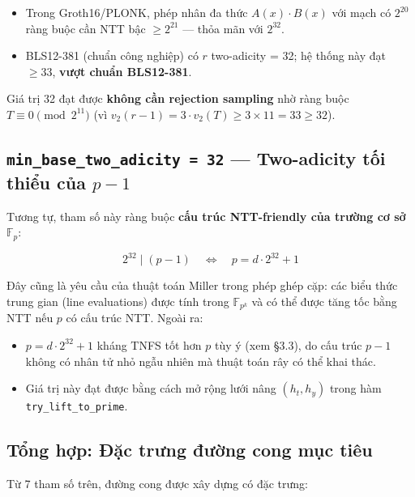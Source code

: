 \begin{itemize}
\tightlist
\item
  Trong Groth16/PLONK, phép nhân đa thức \(A(x) \cdot B(x)\) với mạch có
  \(2^{20}\) ràng buộc cần NTT bậc \(\geq 2^{21}\) --- thỏa mãn với
  \(2^{32}\).
\item
  BLS12-381 (chuẩn công nghiệp) có \(r\) two-adicity = 32; hệ thống này
  đạt \(\geq 33\), \textbf{vượt chuẩn BLS12-381}.
\end{itemize}

Giá trị 32 đạt được \textbf{không cần rejection sampling} nhờ ràng buộc
\(T \equiv 0 \pmod{2^{11}}\) (vì
\(v_2(r-1) = 3 \cdot v_2(T) \geq 3 \times 11 = 33 \geq 32\)).

\subsection{\texorpdfstring{\texttt{min\_base\_two\_adicity\ =\ 32} ---
Two-adicity tối thiểu của
\(p - 1\)}{min\_base\_two\_adicity = 32 --- Two-adicity tối thiểu của p - 1}}\label{min_base_two_adicity-32-two-adicity-tux1ed1i-thiux1ec3u-cux1ee7a-p---1}

Tương tự, tham số này ràng buộc \textbf{cấu trúc NTT-friendly của trường
cơ sở \(\mathbb{F}_p\)}:

\[2^{32} \mid (p - 1) \quad \Longleftrightarrow \quad p = d \cdot 2^{32} + 1\]

Đây cũng là yêu cầu của thuật toán Miller trong phép ghép cặp: các biểu
thức trung gian (line evaluations) được tính trong \(\mathbb{F}_{p^k}\)
và có thể được tăng tốc bằng NTT nếu \(p\) có cấu trúc NTT. Ngoài ra:

\begin{itemize}
\tightlist
\item
  \(p = d \cdot 2^{32} + 1\) kháng TNFS tốt hơn \(p\) tùy ý (xem §3.3),
  do cấu trúc \(p-1\) không có nhân tử nhỏ ngẫu nhiên mà thuật toán rây
  có thể khai thác.
\item
  Giá trị này đạt được bằng cách mở rộng lưới nâng \((h_t, h_y)\) trong
  hàm \texttt{try\_lift\_to\_prime}.
\end{itemize}

\subsection{Tổng hợp: Đặc trưng đường cong mục
tiêu}\label{tux1ed5ng-hux1ee3p-ux111ux1eb7c-trux1b0ng-ux111ux1b0ux1eddng-cong-mux1ee5c-tiuxeau}

Từ 7 tham số trên, đường cong được xây dựng có đặc trưng:

